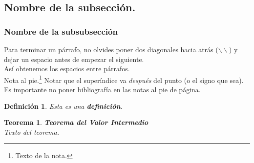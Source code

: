 \documentclass[spanish,twoside]{book}
\newtheorem{theorem}{Teorema}
\newtheorem{definition}{Definición}
\begin{document}
\subsection*{Nombre de la subsecci\'on.}

\subsubsection*{Nombre de la subsubsecci\'on}






Para terminar un p\'arrafo, no olvides poner dos diagonales hacia atr\'as ($\backslash \backslash$) y dejar un espacio antes de empezar el siguiente.\\

As\'i obtenemos los espacios entre p\'arrafos.\\




Nota al pie.\footnote{Texto de la nota.} Notar que el superíndice va \textit{después} del punto (o el signo que sea). Es importante no poner bibliografía en las notas al pie de p\'agina.\\




\begin{definition}
Esta es una \textbf{definici\'on}. 
\end{definition}

\begin{theorem} %
\textbf{Teorema del Valor Intermedio}\\
Texto del teorema.%
\end{theorem} %
\end{document}

